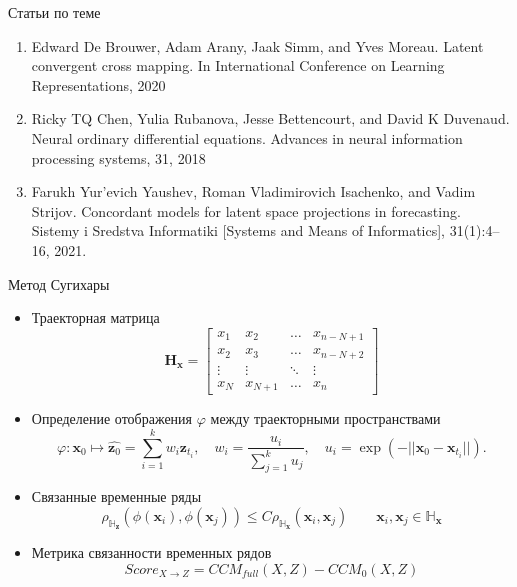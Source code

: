 \documentclass{beamer}
\newcommand{\bx}{\mathbf{x}}
\newcommand{\bz}{\mathbf{z}}
\newcommand{\dH}{\mathds{H}}
\begin{document}
	\begin{frame}{Статьи по теме}
		\begin{enumerate}
			\item Edward De Brouwer, Adam Arany, Jaak Simm, and Yves Moreau. Latent convergent
			cross mapping. In International Conference on Learning Representations, 2020
			\item Ricky TQ Chen, Yulia Rubanova, Jesse Bettencourt, and David K Duvenaud. Neural
			ordinary differential equations. Advances in neural information processing systems, 31,
			2018
			\item Farukh Yur’evich Yaushev, Roman Vladimirovich Isachenko, and Vadim Strijov.
			Concordant models for latent space projections in forecasting. Sistemy i Sredstva
			Informatiki [Systems and Means of Informatics], 31(1):4–16, 2021.
		\end{enumerate}
	\end{frame}

	\begin{frame}{Метод Сугихары}
		\begin{itemize}
			\item[\textbullet] Траекторная матрица
			\[ \textbf{H}_{\bx} = \begin{bmatrix}
				x_1 & x_2 & \ldots & x_{n-N+1} \\
				x_2 & x_3 & \ldots & x_{n-N+2} \\
				\vdots & \vdots & \ddots & \vdots \\
				x_{N} & x_{N+1} & \ldots & x_n
			\end{bmatrix}\]
		
			\item[\textbullet] Определение отображения $\varphi$ между траекторными пространствами
			\[ \varphi: \bx_0 \mapsto \widehat{\bz_0} = \sum\limits_{i=1}^k w_i \bz_{t_i}, \quad 
			w_i = \dfrac{u_i}{\sum\limits_{j=1}^k u_j}, \quad
			u_i = \exp(-||\bx_0 - \bx_{t_i}||). \]
			
			\item[\textbullet] Связанные временные ряды
			\[ \rho_{\dH_{\bz}}(\phi(\bx_i), \phi(\bx_j)) \leq C \rho_{\dH_{\bx}}(\bx_i, \bx_j) \qquad \bx_i, \bx_j \in \dH_{\bx} \]
			
			\item[\textbullet] Метрика связанности временных рядов
			\[ Score_{X \rightarrow Z} = CCM_{full}(X, Z) - CCM_0(X, Z) \]
		\end{itemize}
	\end{frame}
\end{document}
